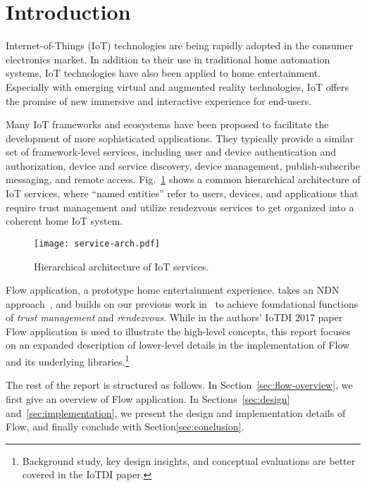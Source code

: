 \section{Introduction}
\label{sec:introduction}

Internet-of-Things (IoT) technologies are being rapidly adopted in the consumer electronics market.
In addition to their use in traditional home automation systems, IoT technologies have also been applied to home entertainment. 
Especially with emerging virtual and augmented reality technologies, IoT offers the promise of new immersive and interactive experience for end-users.

Many IoT frameworks and ecosystems have been proposed to facilitate the development of more sophisticated applications.
They typically provide a similar set of framework-level services, including user and device authentication and authorization, device and service discovery, device management, publish-subscribe messaging, and remote access.
Fig.~\ref{fig:service-arch} shows a common hierarchical architecture of IoT services, where ``named entities'' refer to users, devices, and applications that require trust management and utilize rendezvous services to get organized into a coherent home IoT system.

\begin{figure}[!t]
\centering
\texttt{[image: service-arch.pdf]}
\caption{Hierarchical architecture of IoT services.}
\label{fig:service-arch}
\end{figure}

Flow application, a prototype home entertainment experience, takes an NDN approach~\cite{ccn-van,ndn}, and builds on our previous work in~\cite{ndn-iot} to achieve foundational functions of \emph{trust management} and \emph{rendezvous}.
While in the authors' IoTDI 2017 paper Flow application is used to illustrate the high-level concepts, this report focuses on an expanded description of lower-level details in the implementation of Flow and its underlying libraries.\footnote{Background study, key design insights, and conceptual evaluations are better covered in the IoTDI paper.}

The rest of the report is structured as follows. 
In Section~\ref{sec:flow-overview}, we first give an overview of Flow application.
In Sections~\ref{sec:design} and~\ref{sec:implementation}, we present the design and implementation details of Flow, and finally conclude with Section\ref{sec:conclusion}.
